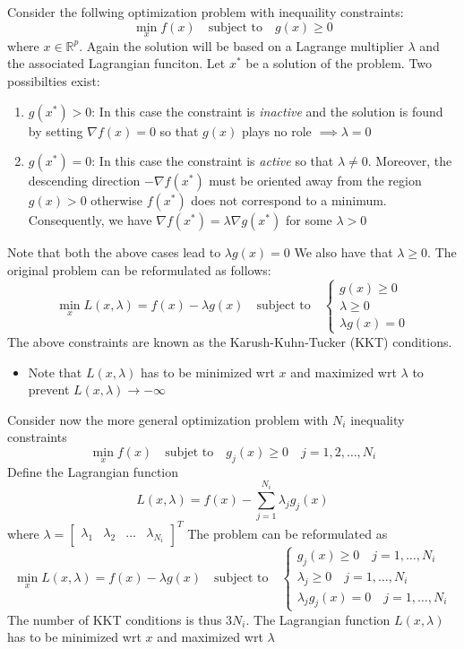 \documentclass{book}
\theoremstyle{definition}
\theoremstyle{remark}
\theoremstyle{remark}
\begin{document}
Consider the follwing optimization problem with inequaility constraints:
\[
    \min_x f(x)\quad\text{subject to}\quad g(x)\geq 0
\]
where $x\in\mathbb{R}^p$. Again the solution will be based on a Lagrange multiplier $\lambda$ and the associated Lagrangian funciton. Let $x^*$ be a solution of the problem. Two possibilties exist: 
\begin{enumerate}
    \item $g(x^*)>0$: In this case the constraint is \emph{inactive} and the solution is found by setting $\nabla f(x)=0$ so that $g(x)$ plays no role $\implies \lambda=0$
    \item $g(x^*)=0$: In this case the constraint is \emph{active} so that $\lambda\neq 0$. Moreover, the descending direction $-\nabla f(x^*)$ must be oriented away from the region $g(x)>0$ otherwise $f(x^*)$ does not correspond to a minimum. Consequently, we have $\nabla f(x^*)=\lambda\nabla g(x^*)$ for some $\lambda>0$
\end{enumerate}
Note that both the above cases lead to $\lambda g(x)=0$ We also have that $\lambda\geq 0$.
The original problem can be reformulated as follows: 
\[
    \min_x L(x,\lambda)=f(x)-\lambda g(x) \quad \text{subject to}\quad \begin{cases}
        g(x) \geq 0\\
        \lambda \geq 0 \\
        \lambda g(x) = 0
    \end{cases}
\]
The above constraints are known as the Karush-Kuhn-Tucker (KKT) conditions. 
\begin{itemize}
    \item Note that $L(x,\lambda)$ has to be minimized wrt $x$ and maximized wrt $\lambda$ to prevent $L(x,\lambda)\to-\infty$
\end{itemize}
Consider now the more general optimization problem with $N_i$ inequality constraints 
\[
    \min_x f(x) \quad \text{subjet to}\quad g_j(x)\geq 0\quad j=1,2,\dots,N_i
\]
Define the Lagrangian function 
\[
    L(x,\lambda)= f(x)-\displaystyle\sum_{j=1}^{N_i}\lambda_jg_j(x)
\]
where $\lambda=\begin{bmatrix}
    \lambda_1 & \lambda_2 & \dots & \lambda_{N_i}
\end{bmatrix}^T$
The problem can be reformulated as
\[
    \min_x L(x,\lambda)=f(x)-\lambda g(x) \quad \text{subject to}\quad \begin{cases}
        g_j(x) \geq 0 \quad j=1,\dots,N_i\\
        \lambda_j \geq 0 \quad j=1,\dots,N_i\\
        \lambda_j g_j(x) = 0 \quad j=1,\dots,N_i
    \end{cases}
\]
The number of KKT conditions is thus $3N_i$. The Lagrangian function $L(x,\lambda)$ has to be minimized wrt $x$ and maximized wrt $\lambda$
\end{document}
